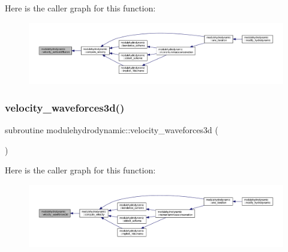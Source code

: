 Here is the caller graph for this function\+:\nopagebreak
\begin{figure}[H]
\begin{center}
\leavevmode
\includegraphics[width=350pt]{namespacemodulehydrodynamic_adb227f6b4fa5a958b2dd2061dbfcb22d_icgraph}
\end{center}
\end{figure}
\mbox{\label{namespacemodulehydrodynamic_a7cadc35d4f0e4955a2d416039a2a2d18}} 
\subsubsection{\texorpdfstring{velocity\+\_\+waveforces3d()}{velocity\_waveforces3d()}}
{\footnotesize\ttfamily subroutine modulehydrodynamic\+::velocity\+\_\+waveforces3d (\begin{DoxyParamCaption}{ }\end{DoxyParamCaption})\hspace{0.3cm}{\ttfamily [private]}}

Here is the caller graph for this function\+:\nopagebreak
\begin{figure}[H]
\begin{center}
\leavevmode
\includegraphics[width=350pt]{namespacemodulehydrodynamic_a7cadc35d4f0e4955a2d416039a2a2d18_icgraph}
\end{center}
\end{figure}
\mbox{\label{namespacemodulehydrodynamic_ad5e5fda7c09616794f5a3e2d1a317161}} 
